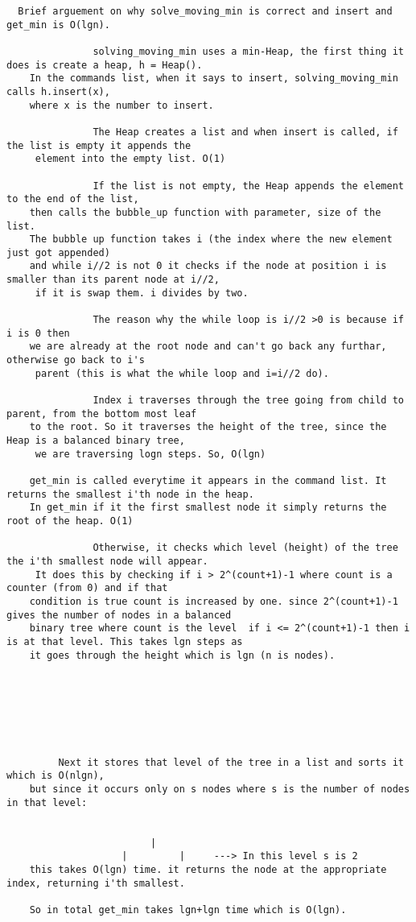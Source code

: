 \documentclass{assignment-263}
\begin{document}
\begin{verbatim}
  Brief arguement on why solve_moving_min is correct and insert and get_min is O(lgn).

	           solving_moving_min uses a min-Heap, the first thing it does is create a heap, h = Heap().
	In the commands list, when it says to insert, solving_moving_min calls h.insert(x), 
	where x is the number to insert. 

	           The Heap creates a list and when insert is called, if the list is empty it appends the
	 element into the empty list. O(1)

	           If the list is not empty, the Heap appends the element to the end of the list,
	then calls the bubble_up function with parameter, size of the list. 
	The bubble up function takes i (the index where the new element just got appended)
	and while i//2 is not 0 it checks if the node at position i is smaller than its parent node at i//2,
	 if it is swap them. i divides by two. 

	           The reason why the while loop is i//2 >0 is because if i is 0 then
	we are already at the root node and can't go back any furthar, otherwise go back to i's
	 parent (this is what the while loop and i=i//2 do).
	
	           Index i traverses through the tree going from child to parent, from the bottom most leaf 
	to the root. So it traverses the height of the tree, since the Heap is a balanced binary tree,
	 we are traversing logn steps. So, O(lgn)

	get_min is called everytime it appears in the command list. It returns the smallest i'th node in the heap.
	In get_min if it the first smallest node it simply returns the root of the heap. O(1)

	           Otherwise, it checks which level (height) of the tree the i'th smallest node will appear.
	 It does this by checking if i > 2^(count+1)-1 where count is a counter (from 0) and if that 
	condition is true count is increased by one. since 2^(count+1)-1 gives the number of nodes in a balanced 
	binary tree where count is the level  if i <= 2^(count+1)-1 then i is at that level. This takes lgn steps as
	it goes through the height which is lgn (n is nodes).







	     Next it stores that level of the tree in a list and sorts it which is O(nlgn), 
	but since it occurs only on s nodes where s is the number of nodes in that level:


	                     |
	                |         |     ---> In this level s is 2
	this takes O(lgn) time. it returns the node at the appropriate index, returning i'th smallest.

	So in total get_min takes lgn+lgn time which is O(lgn).



\end{verbatim}
\end{document}
